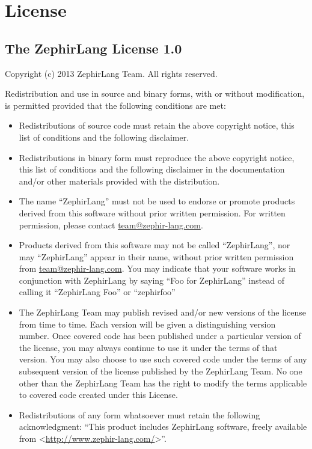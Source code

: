 \documentclass[letterpaper,10pt,english]{sphinxmanual}
\begin{document}
\section{License}
\label{license::doc}\label{license:license}

\subsection{The ZephirLang License 1.0}
\label{license:the-zephirlang-license-1-0}
Copyright (c) 2013 ZephirLang Team. All rights reserved.

Redistribution and use in source and binary forms, with or without modification, is permitted provided that the following conditions are met:
\begin{itemize}
\item {} 
Redistributions of source code must retain the above copyright notice, this list of conditions and the following disclaimer.

\item {} 
Redistributions in binary form must reproduce the above copyright notice, this list of conditions and the following disclaimer in the documentation and/or other materials provided with the distribution.

\item {} 
The name ``ZephirLang'' must not be used to endorse or promote products derived from this software without prior written permission. For written permission, please contact \href{mailto:team@zephir-lang.com}{team@zephir-lang.com}.

\item {} 
Products derived from this software may not be called ``ZephirLang'', nor may ``ZephirLang'' appear in their name, without prior written permission from \href{mailto:team@zephir-lang.com}{team@zephir-lang.com}.  You may indicate that your software works in conjunction with ZephirLang by saying ``Foo for ZephirLang'' instead of calling it ``ZephirLang Foo'' or ``zephirfoo''

\item {} 
The ZephirLang Team may publish revised and/or new versions of the license from time to time. Each version will be given a distinguishing version number. Once covered code has been published under a particular version of the license, you may always continue to use it under the terms of that version. You may also choose to use such covered code under the terms of any subsequent version of the license published by the ZephirLang Team. No one other than the ZephirLang Team has the right to modify the terms applicable to covered code created under this License.

\item {} 
Redistributions of any form whatsoever must retain the following acknowledgment: ``This product includes ZephirLang software, freely available from \textless{}\href{http://www.zephir-lang.com/}{http://www.zephir-lang.com/}\textgreater{}''.

\end{itemize}
\end{document}
